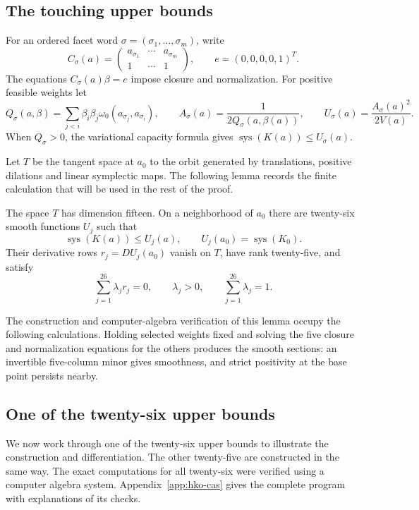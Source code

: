 \subsection{The touching upper bounds}
For an ordered facet word $\sigma=(\sigma_1,\ldots,\sigma_m)$, write
\[
 C_\sigma(a)=
 \begin{pmatrix}a_{\sigma_1}&\cdots&a_{\sigma_m}\\1&\cdots&1\end{pmatrix},
 \qquad e=(0,0,0,0,1)^T.
\]
The equations $C_\sigma(a)\beta=e$ impose closure and normalization.
For positive feasible weights let
\[
 Q_\sigma(a,\beta)=\sum_{j<i}\beta_i\beta_j
 \omega_0(a_{\sigma_j},a_{\sigma_i}),\qquad
 A_\sigma(a)=\frac1{2Q_\sigma(a,\beta(a))},\qquad
 U_\sigma(a)=\frac{A_\sigma(a)^2}{2V(a)}.
\]
When $Q_\sigma>0$, the variational capacity formula gives
$\operatorname{sys}(K(a))\leq U_\sigma(a)$.

Let $T$ be the tangent space at $a_0$ to the orbit generated by translations,
positive dilations and linear symplectic maps. The following lemma records
the finite calculation that will be used in the rest of the proof.
\begin{lemma}\label{lem:hko-exact-bounds}
The space $T$ has dimension fifteen. On a neighborhood of $a_0$ there are
twenty-six smooth functions $U_j$ such that
\[
 \operatorname{sys}(K(a))\leq U_j(a),\qquad
 U_j(a_0)=\operatorname{sys}(K_0).
\]
Their derivative rows $r_j=DU_j(a_0)$ vanish on $T$, have rank twenty-five,
and satisfy
\[
 \sum_{j=1}^{26}\lambda_jr_j=0,\qquad
 \lambda_j>0,\qquad \sum_{j=1}^{26}\lambda_j=1.
\]
\end{lemma}
The construction and computer-algebra verification of this lemma occupy
the following calculations. Holding selected weights fixed and solving
the five closure and normalization equations for the others produces the
smooth sections: an invertible five-column minor gives smoothness, and
strict positivity at the base point persists nearby.

\subsection*{One of the twenty-six upper bounds}

We now work through one of the twenty-six upper bounds to illustrate the
construction and differentiation. The other twenty-five are constructed
in the same way. The exact computations for all twenty-six were verified
using a computer algebra system. Appendix~\ref{app:hko-cas} gives the complete
program with explanations of its checks.

